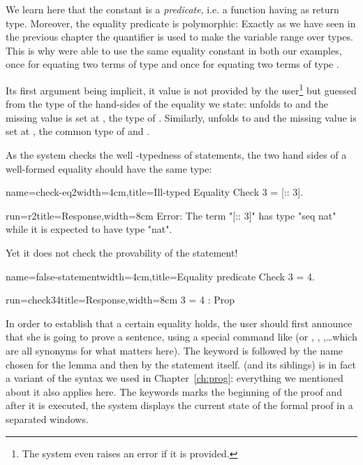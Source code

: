 We learn here that the constant  is a \emph{predicate}, i.e. a
function having  as return type. Moreover, the equality
predicate is polymorphic: Exactly as we have seen in the previous
chapter the  quantifier is used to make the variable 
range over types. This is why were able to use the same equality
constant in both our examples, once for equating two terms of type
 and once for equating two terms of type .

Its first argument being implicit, it value is not provided by the
user\footnote{The system even raises an error if it is provided.} but
guessed from the type of the hand-sides of the equality we state:  unfolds to  and the missing value is set at
, the type of . Similarly, 
unfolds to  and the missing value is set
at , the common type of  and .

As the \Coq{} system checks the well -typedness of statements,
the two hand sides of a well-formed equality should have the same
type:

\begin{coq}{name=check-eq2}{width=4cm,title=Ill-typed Equality}
Check 3 = [:: 3].
$~$
\end{coq}
\begin{coqout}{run=r2}{title=Response,width=8cm}
Error: The term "[:: 3]" has type "seq nat"
 while it is expected to have type "nat".
\end{coqout}

Yet it does not check the provability of the statement!

\begin{coq}{name=false-statement}{width=4cm,title=Equality predicate}
Check 3 = 4.
\end{coq}
\begin{coqout}{run=check34}{title=Response,width=8cm}
3 = 4 : Prop
\end{coqout}

In order to establish that a certain equality holds, the user should
first announce that she is going to prove a sentence, using a special
command like  (or , ,
,\dots which are all synonyms for what matters here).
The  keyword is followed by the name chosen for the lemma and
then by the statement itself.  (and its siblings) is in fact
a variant of the  syntax we used in
Chapter~\ref{ch:prog}: everything we mentioned about it also applies
here. The  keywords marks the beginning of the proof and
after it is executed, the system displays the current state of the
formal proof in a separated windows.


